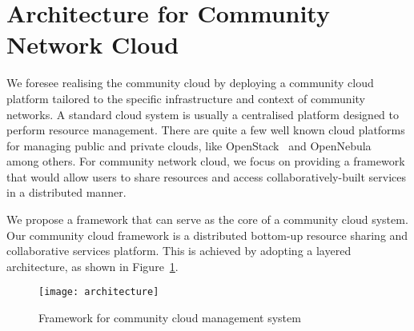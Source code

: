 

\section{Architecture for Community Network Cloud}
\label{sec__cloud_arch}

We foresee realising the community cloud by deploying a community cloud platform tailored to the specific infrastructure and context of community networks. 
A standard cloud system is usually a centralised platform designed to perform resource management. 
There are quite a few well known cloud platforms for managing public and private clouds, 
like OpenStack~\cite{OpenStack} and OpenNebula~\cite{OpenNebula} among others. 
For community network cloud, we focus on providing a framework that would allow users to share resources and access collaboratively-built services in a distributed manner.

We propose a framework that can serve as the core of a community cloud system. 
Our community cloud framework is a distributed bottom-up resource sharing and collaborative services platform.
This is achieved by adopting a layered architecture, as shown in Figure~\ref{fig:cloud-architecture}. 

\begin{figure}[tbp]
	\centering
	\texttt{[image: architecture]} 
	\caption{Framework for community cloud management system}
	\label{fig:cloud-architecture}
\end{figure}

